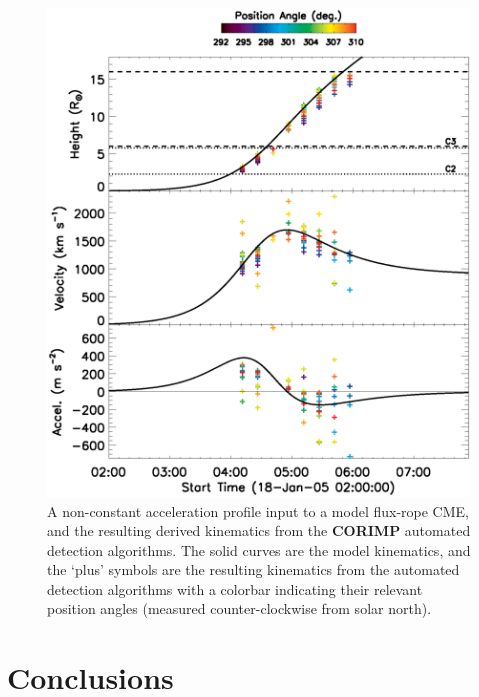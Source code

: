 \documentclass[preprint2]{aastex}
\begin{document}
\begin{figure}[!t]
\centerline{\includegraphics[scale=0.39]{figure_peak_accel.eps}}
\caption{A non-constant acceleration profile input to a model flux-rope CME, and the resulting derived kinematics from the {\bf CORIMP} automated detection algorithms. The solid curves are the model kinematics, and the `plus' symbols are the resulting kinematics from the automated detection algorithms with a colorbar indicating their relevant position angles (measured counter-clockwise from solar north).}
\label{figure_peak_accel}
\end{figure}

\section{Conclusions}
\label{sect_conclusions}
\end{document}
